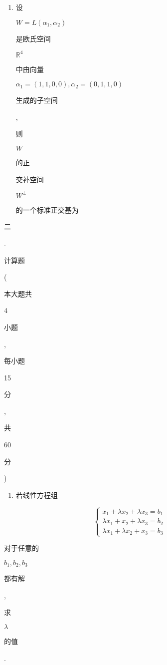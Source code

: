 \documentclass[10pt]{article}
\begin{document}
\begin{enumerate}
  \item \begin{CJK}{UTF8}{mj}设\end{CJK} $W=L\left(\alpha_{1}, \alpha_{2}\right)$ \begin{CJK}{UTF8}{mj}是欧氏空间\end{CJK} $\mathbb{R}^{4}$ \begin{CJK}{UTF8}{mj}中由向量\end{CJK} $\alpha_{1}=(1,1,0,0), \alpha_{2}=(0,1,1,0)$ \begin{CJK}{UTF8}{mj}生成的子空间\end{CJK}, \begin{CJK}{UTF8}{mj}则\end{CJK} $W$ \begin{CJK}{UTF8}{mj}的正\end{CJK} \begin{CJK}{UTF8}{mj}交补空间\end{CJK} $W^{\perp}$ \begin{CJK}{UTF8}{mj}的一个标准正交基为\end{CJK}

\end{enumerate}
\begin{CJK}{UTF8}{mj}二\end{CJK}. \begin{CJK}{UTF8}{mj}计算题\end{CJK} (\begin{CJK}{UTF8}{mj}本大题共\end{CJK} 4 \begin{CJK}{UTF8}{mj}小题\end{CJK}, \begin{CJK}{UTF8}{mj}每小题\end{CJK} 15 \begin{CJK}{UTF8}{mj}分\end{CJK}, \begin{CJK}{UTF8}{mj}共\end{CJK} 60 \begin{CJK}{UTF8}{mj}分\end{CJK})

\begin{enumerate}
  \item \begin{CJK}{UTF8}{mj}若线性方程组\end{CJK}
\end{enumerate}
$$
\left\{\begin{array}{l}
x_{1}+\lambda x_{2}+\lambda x_{3}=b_{1} \\
\lambda x_{1}+x_{2}+\lambda x_{3}=b_{2} \\
\lambda x_{1}+\lambda x_{2}+x_{3}=b_{3}
\end{array}\right.
$$
\begin{CJK}{UTF8}{mj}对于任意的\end{CJK} $b_{1}, b_{2}, b_{3}$ \begin{CJK}{UTF8}{mj}都有解\end{CJK}, \begin{CJK}{UTF8}{mj}求\end{CJK} $\lambda$ \begin{CJK}{UTF8}{mj}的值\end{CJK}.
\end{document}
